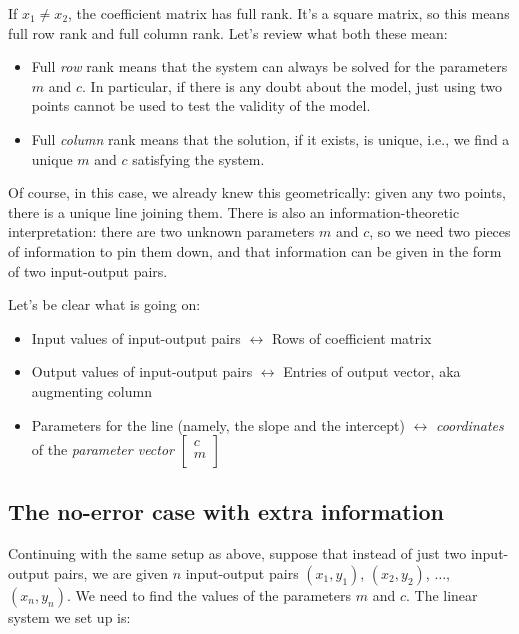 \documentclass[10pt]{amsart}
\begin{document}
If $x_1 \ne x_2$, the coefficient matrix has full rank. It's a square
matrix, so this means full row rank and full column rank. Let's review
what both these mean:

\begin{itemize}
\item Full {\em row} rank means that the system can always be solved
  for the parameters $m$ and $c$. In particular, if there is any doubt
  about the model, just using two points cannot be used to test the
  validity of the model.
\item Full {\em column} rank means that the solution, if it exists, is
  unique, i.e., we find a unique $m$ and $c$ satisfying the system.
\end{itemize}

Of course, in this case, we already knew this geometrically: given any
two points, there is a unique line joining them. There is also an
information-theoretic interpretation: there are two unknown parameters
$m$ and $c$, so we need two pieces of information to pin them down,
and that information can be given in the form of two input-output
pairs.

Let's be clear what is going on:

\begin{itemize}
\item Input values of input-output pairs $\leftrightarrow$ Rows of
  coefficient matrix
\item Output values of input-output pairs $\leftrightarrow$ Entries of
  output vector, aka augmenting column
\item Parameters for the line (namely, the slope and the intercept)
  $\leftrightarrow$ {\em coordinates} of the {\em parameter vector}
  $\left[\begin{matrix} c \\ m \\\end{matrix}\right]$
\end{itemize}


\subsection{The no-error case with extra information}

Continuing with the same setup as above, suppose that instead of just
two input-output pairs, we are given $n$ input-output pairs
$(x_1,y_1)$, $(x_2,y_2)$, $\dots$, $(x_n,y_n)$. We need to find the
values of the parameters $m$ and $c$. The linear system we set up is:
\end{document}
